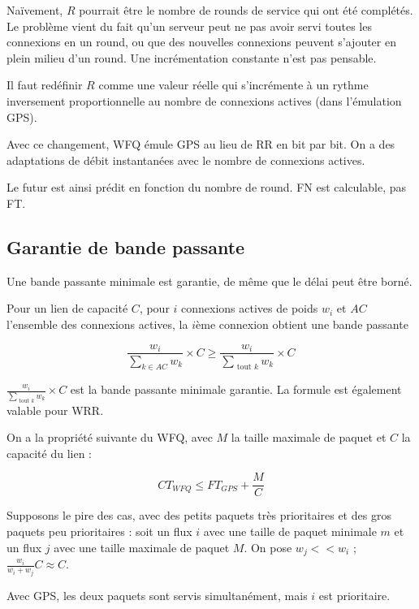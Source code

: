 			Naïvement, $R$ pourrait être le nombre de rounds de service qui ont été complétés. Le problème vient du fait qu'un serveur peut ne pas avoir servi toutes les connexions en un round, ou que des nouvelles connexions peuvent s'ajouter en plein milieu d'un round. Une incrémentation constante n'est pas pensable.
			
			Il faut redéfinir $R$ comme une valeur réelle qui s'incrémente à un rythme inversement proportionnelle au nombre de connexions actives (dans l'émulation GPS).
			
			Avec ce changement, WFQ émule GPS au lieu de RR en bit par bit. On a des adaptations de débit instantanées avec le nombre de connexions actives.
			
						
			Le futur est ainsi prédit en fonction du nombre de round. FN est calculable, pas FT.
			
			
			\subsection{Garantie de bande passante}
			
			Une bande passante minimale est garantie, de même que le délai peut être borné.
			
			Pour un lien de capacité $C$, pour $i$ connexions actives de poids $w_i$ et $AC$ l'ensemble des connexions actives, la $i$ème connexion obtient une bande passante
			
			$$\frac{w_i}{\sum_{k \in AC} w_k} \times C \geq \frac{w_i}{\sum_{\text{ tout } k}w_k} \times C$$
			
			$\frac{w_i}{\sum_{\text{ tout } k}w_k} \times C$ est la bande passante minimale garantie. La formule est également valable pour WRR.
			
			On a la propriété suivante du WFQ, avec $M$ la taille maximale de paquet et $C$ la capacité du lien :
			
			$$CT_{WFQ} \leq FT_{GPS} + \frac{M}{C}$$
			
			Supposons le pire des cas, avec des petits paquets très prioritaires et des gros paquets peu prioritaires : soit un flux $i$ avec une taille de paquet minimale $m$ et un flux $j$ avec une taille maximale de paquet $M$. On pose $w_j << w_i$ ; $\frac{w_i}{w_i + w_j} C \approx C$. 
			
			Avec GPS, les deux paquets sont servis simultanément, mais $i$ est prioritaire.
						
			
